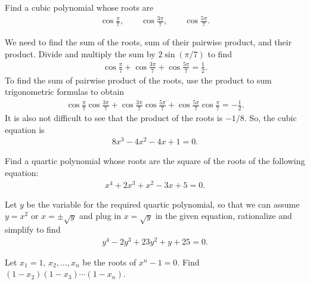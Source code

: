 \begin{question}
    Find a cubic polynomial whose roots are
    \begin{align*}
        \cos\frac{\pi}{7}, \qquad \cos\frac{3\pi}{7}, \qquad \cos\frac{5\pi}{7}.
    \end{align*}
\end{question}

\begin{solution}
    We need to find the sum of the roots, sum of their pairwise product, and their product. Divide and multiply the sum by $2\sin(\pi/7)$ to find
    \begin{align*}
        \cos\frac{\pi}{7}+ \cos\frac{3\pi}{7}+ \cos\frac{5\pi}{7} = \frac{1}{2}.
    \end{align*}
    To find the sum of pairwise product of the roots, use the product to sum trigonometric formulas to obtain
    \begin{align*}
        \cos\frac{\pi}{7}\cos\frac{3\pi}{7}+ \cos\frac{3\pi}{7}\cos\frac{5\pi}{7}+ \cos\frac{5\pi}{7}\cos\frac{\pi}{7} = -\frac{1}{2}.
    \end{align*}
    It is also not difficult to see that the product of the roots is $-1/8$. So, the cubic equation is
    \begin{align*}
        8x^3 - 4x^2 - 4x + 1 = 0.
    \end{align*}
\end{solution}

\begin{question}
    Find a quartic polynomial whose roots are the square of the roots of the following equation:
    \begin{align*}
        x^4 + 2x^3 + x^2 - 3x + 5 = 0.
    \end{align*}
\end{question}

\begin{solution}
    Let $y$ be the variable for the required quartic polynomial, so that we can assume $y=x^2$ or $x=\pm \sqrt{y}$ and plug in $x=\sqrt y$ in the given equation, rationalize and simplify to find
    \begin{align*}
        y^4 - 2y^3 + 23y^2 + y + 25 = 0.
    \end{align*}
\end{solution}


\begin{question}
    Let $x_1=1$, $x_2,\dots, x_n$ be the roots of $x^n-1=0$. Find $(1-x_2)(1-x_3)\cdots (1-x_n)$.
\end{question}

